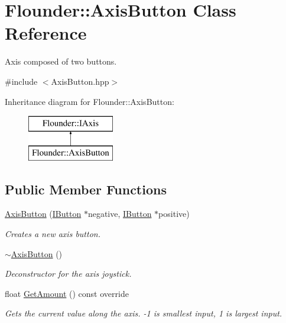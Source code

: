 \hypertarget{class_flounder_1_1_axis_button}{}\section{Flounder\+:\+:Axis\+Button Class Reference}
\label{class_flounder_1_1_axis_button}


Axis composed of two buttons.  




{\ttfamily \#include $<$Axis\+Button.\+hpp$>$}

Inheritance diagram for Flounder\+:\+:Axis\+Button\+:\begin{figure}[H]
\begin{center}
\leavevmode
\includegraphics[height=2.000000cm]{class_flounder_1_1_axis_button}
\end{center}
\end{figure}
\subsection*{Public Member Functions}
\begin{DoxyCompactItemize}
\item 
\hyperlink{class_flounder_1_1_axis_button_ab70b23665539aa2701a2e732f2ea2d86}{Axis\+Button} (\hyperlink{class_flounder_1_1_i_button}{I\+Button} $\ast$negative, \hyperlink{class_flounder_1_1_i_button}{I\+Button} $\ast$positive)
\begin{DoxyCompactList}\small\item\em Creates a new axis button. \end{DoxyCompactList}\item 
\hyperlink{class_flounder_1_1_axis_button_a6e1fe136c199ced1f92ba1187faae91e}{$\sim$\+Axis\+Button} ()
\begin{DoxyCompactList}\small\item\em Deconstructor for the axis joystick. \end{DoxyCompactList}\item 
float \hyperlink{class_flounder_1_1_axis_button_af7ee21d3b33a7d0eadf6656fec5bdc29}{Get\+Amount} () const override
\begin{DoxyCompactList}\small\item\em Gets the current value along the axis. -\/1 is smallest input, 1 is largest input. \end{DoxyCompactList}\end{DoxyCompactItemize}
